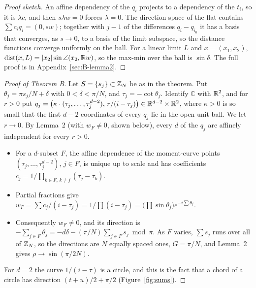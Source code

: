 \documentclass[11pt]{article}
\begin{document}
\begin{proof}[Proof sketch]
An affine dependency of the $q_i$ projects to a dependency of the $t_i$, so it is $\lambda c$, and then
$s\lambda w=0$ forces $\lambda=0$. The direction space of the flat contains $\sum c_iq_i=(0,sw)$;
together with $j-1$ of the differences $q_i-q_{i_0}$ it has a basis that converges, as $s\to0$, to a
basis of the limit subspace, so the distance functions converge uniformly on the ball. For a linear
limit $L$ and $x=(x_1,x_2)$, $\operatorname{dist}(x,L)=|x_2|\sin\angle(x_2,\mathbb{R} w)$, so the max-min over the ball is
$\sin\delta$. The full proof is in Appendix~\ref{sec:B-lemma2}.
\end{proof}

\begin{proof}[Proof of Theorem B]
Let $S=\{s_j\}\subset\mathbb{Z}_N$ be as in the theorem. Put $\theta_j=\pi s_j/N+\delta$ with
$0<\delta<\pi/N$, and $\tau_j=-\cot\theta_j$. Identify $\mathbb C$ with $\mathbb{R}^2$, and for $r>0$ put
$q_j=\bigl(\kappa\cdot(\tau_j,\dots,\tau_j^{d-2}),\,r/(i-\tau_j)\bigr)\in\mathbb{R}^{d-2}\times\mathbb{R}^2$, where
$\kappa>0$ is so small that the first $d-2$ coordinates of every $q_j$ lie in the open unit ball. We let
$r\to0$. By
Lemma~2 (with $w_F\ne0$, shown below), every $d$ of the $q_j$ are affinely independent for every $r>0$.
\begin{itemize}
\item For a $d$-subset $F$, the affine dependence of the moment-curve points
$(\tau_j,\dots,\tau_j^{d-2})$, $j\in F$, is unique up to scale and has coefficients
$c_j=1/\prod_{k\in F,\,k\ne j}(\tau_j-\tau_k)$.
\item Partial fractions give
$w_F=\sum c_j/(i-\tau_j)=1/\prod(i-\tau_j)=\bigl(\prod\sin\theta_j\bigr)e^{-i\sum\theta_j}$.
\item Consequently $w_F\ne0$, and its direction is $-\sum_{j\in F}\theta_j=-d\delta-(\pi/N)\sum_{j\in F}s_j\bmod\pi$. As
$F$ varies, $\sum s_j$ runs over all of $\mathbb{Z}_N$, so the directions are $N$ equally spaced ones,
$G=\pi/N$, and Lemma~2 gives $\rho\to\sin(\pi/2N)$.
\end{itemize}
For $d=2$ the curve $1/(i-\tau)$ is a circle, and this is the fact that a chord of a circle has
direction $(t+u)/2+\pi/2$ (Figure~\ref{fig:sums}).


\end{proof}
\end{document}
